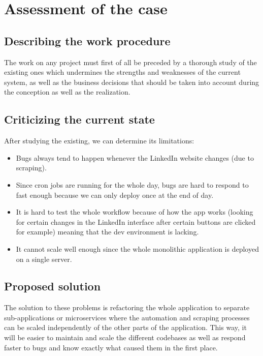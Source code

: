 \section{Assessment of the case}
\subsection{Describing the work procedure}
The work on any project must first of all be preceded by a thorough study of the existing ones which undermines the strengths and weaknesses of the current system, as well as the business decisions that should be taken into account during the conception as well as the realization.
\subsection{Criticizing the current state}
After studying the existing, we can determine its limitations:
\begin{itemize}
    \item Bugs always tend to happen whenever the LinkedIn website changes (due to scraping).
    \item Since cron jobs are running for the whole day, bugs are hard to respond to fast enough because we can only deploy once at the end of day.
    \item It is hard to test the whole workflow because of how the app works (looking for certain changes in the LinkedIn interface after certain buttons are clicked for example) meaning that the dev environment is lacking.
    \item It cannot scale well enough since the whole monolithic application is deployed on a single server.
\end{itemize}
\subsection{Proposed solution}
The solution to these problems is refactoring the whole application to separate sub-applications or microservices where the automation and scraping processes can be scaled independently of the other parts of the application.
This way, it will be easier to maintain and scale the different codebases as well as respond faster to bugs and know exactly what caused them in the first place.

\newpage

